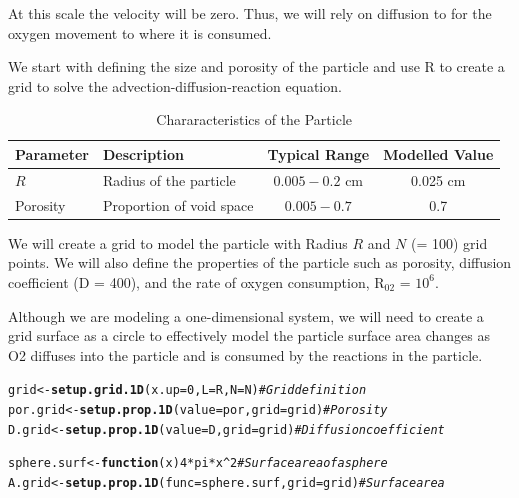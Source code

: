 \documentclass{tufte-handout}\usepackage[]{graphicx}\usepackage[]{xcolor}
\makeatletter
\newcommand{\hlnum}[1]{\textcolor[rgb]{0.686,0.059,0.569}{#1}}%
\newcommand{\hlcom}[1]{\textcolor[rgb]{0.678,0.584,0.686}{\textit{#1}}}%
\newcommand{\hlopt}[1]{\textcolor[rgb]{0,0,0}{#1}}%
\newcommand{\hlstd}[1]{\textcolor[rgb]{0.345,0.345,0.345}{#1}}%
\newcommand{\hlkwa}[1]{\textcolor[rgb]{0.161,0.373,0.58}{\textbf{#1}}}%
\newcommand{\hlkwb}[1]{\textcolor[rgb]{0.69,0.353,0.396}{#1}}%
\newcommand{\hlkwc}[1]{\textcolor[rgb]{0.333,0.667,0.333}{#1}}%
\newcommand{\hlkwd}[1]{\textcolor[rgb]{0.737,0.353,0.396}{\textbf{#1}}}%
\newenvironment{kframe}{%
 \def\at@end@of@kframe{}%
 \ifinner\ifhmode%
  \def\at@end@of@kframe{\end{minipage}}%
  \begin{minipage}{\columnwidth}%
 \fi\fi%
 \def\FrameCommand##1{\hskip\@totalleftmargin \hskip-\fboxsep
 \colorbox{shadecolor}{##1}\hskip-\fboxsep
     \hskip-\linewidth \hskip-\@totalleftmargin \hskip\columnwidth}%
 \MakeFramed {\advance\hsize-\width
   \@totalleftmargin\z@ \linewidth\hsize
   \@setminipage}}%
 {\par\unskip\endMakeFramed%
 \at@end@of@kframe}
\newenvironment{knitrout}{}{} %
\makeatother
\begin{document}
At this scale the velocity will be zero. Thus, we will rely on diffusion to for the oxygen movement to where it is consumed. 



We start with defining the size and porosity of the particle and use R to create a grid to solve the advection-diffusion-reaction equation.

\begin{table}
\caption{Chararacteristics of the Particle}
\centering
\begin{tabular}{|l|l|c|c|} \hline
Parameter & Description & Typical Range &  Modelled Value \\ \hline\hline
\( R \) & Radius of the particle & \( 0.005-0.2 \) cm &  0.025 cm \\
Porosity & Proportion of void space & \(0.005-0.7\) &  0.7 \\ \hline
\end{tabular}
\end{table}

We will create a grid to model the particle with Radius \( R \) and \( N \) (= 100) grid points. We will also define the properties of the particle such as porosity, diffusion coefficient (D = 400), and the rate of oxygen consumption, R$_{02}$ = \ensuremath{10^{6}}.

Although we are modeling a one-dimensional system, we will need to create a grid surface as a circle to effectively model the particle surface area changes as O2 diffuses into the particle and is consumed by the reactions in the particle.

\begin{knitrout}
\color{fgcolor}\begin{kframe}
\begin{alltt}
\hlstd{grid} \hlkwb{<-} \hlkwd{setup.grid.1D}\hlstd{(}\hlkwc{x.up}\hlstd{=}\hlnum{0}\hlstd{,} \hlkwc{L} \hlstd{= R,} \hlkwc{N} \hlstd{= N)} \hlcom{# Grid definition}
\hlstd{por.grid} \hlkwb{<-} \hlkwd{setup.prop.1D}\hlstd{(}\hlkwc{value}\hlstd{=por,} \hlkwc{grid}\hlstd{=grid)} \hlcom{# Porosity}
\hlstd{D.grid} \hlkwb{<-} \hlkwd{setup.prop.1D}\hlstd{(}\hlkwc{value}\hlstd{=D,} \hlkwc{grid}\hlstd{=grid)} \hlcom{# Diffusion coefficient}

\hlstd{sphere.surf} \hlkwb{<-} \hlkwa{function}\hlstd{(}\hlkwc{x}\hlstd{)} \hlnum{4}\hlopt{*}\hlstd{pi}\hlopt{*}\hlstd{x}\hlopt{^}\hlnum{2} \hlcom{# Surface area of a sphere}
\hlstd{A.grid} \hlkwb{<-} \hlkwd{setup.prop.1D}\hlstd{(}\hlkwc{func}\hlstd{=sphere.surf,}  \hlkwc{grid}\hlstd{=grid)} \hlcom{# Surface area}
\end{alltt}
\end{kframe}
\end{knitrout}
\end{document}
